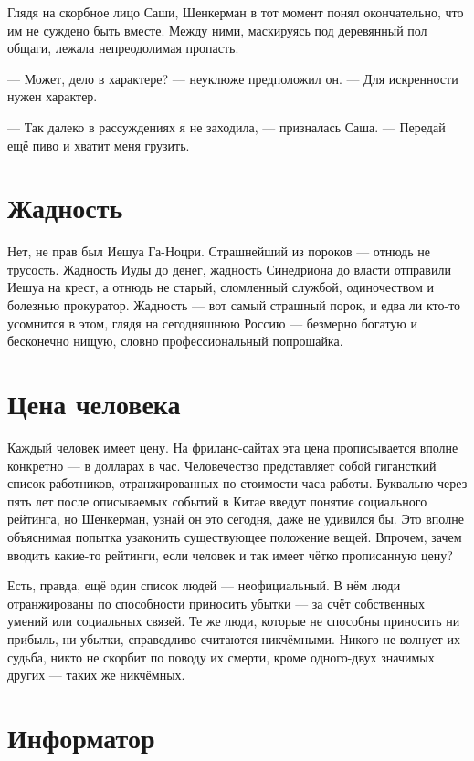 \documentclass[a4paper,10pt,fleqn]{book}\usepackage{polyglossia}\setdefaultlanguage{english}\setotherlanguage{russian}\defaultfontfeatures{Ligatures=TeX,Mapping=tex-text} \usepackage{xcolor}\definecolor{lightgray}{HTML}{bbbbbb}\color{lightgray}\newcommand{\ml}[3]{\textcolor{black}{#3}}
\begin{document}
Глядя на скорбное лицо Саши, Шенкерман в тот момент понял окончательно, что им не суждено быть вместе.
Между ними, маскируясь под деревянный пол общаги, лежала непреодолимая пропасть.

--- Может, дело в характере? --- неуклюже предположил он.
--- Для искренности нужен характер.

--- Так далеко в рассуждениях я не заходила, --- призналась Саша.
--- Передай ещё пиво и хватит меня грузить.

\section{Жадность}

Нет, не прав был Иешуа Га-Ноцри.
Страшнейший из пороков --- отнюдь не трусость.
Жадность Иуды до денег, жадность Синедриона до власти отправили Иешуа на крест, а отнюдь не старый, сломленный службой, одиночеством и болезнью прокуратор.
Жадность --- вот самый страшный порок, и едва ли кто-то усомнится в этом, глядя на сегодняшнюю Россию --- безмерно богатую и бесконечно нищую, словно профессиональный попрошайка.

\section{Цена человека}

Каждый человек имеет цену.
На фриланс-сайтах эта цена прописывается вполне конкретно --- в долларах в час.
Человечество представляет собой гигансткий список работников, отранжированных по стоимости часа работы.
Буквально через пять лет после описываемых событий в Китае введут понятие социального рейтинга, но Шенкерман, узнай он это сегодня, даже не удивился бы.
Это вполне объяснимая попытка узаконить существующее положение вещей.
Впрочем, зачем вводить какие-то рейтинги, если человек и так имеет чётко прописанную цену?

Есть, правда, ещё один список людей --- неофициальный.
В нём люди отранжированы по способности приносить убытки --- за счёт собственных умений или социальных связей.
Те же люди, которые не способны приносить ни прибыль, ни убытки, справедливо считаются никчёмными.
Никого не волнует их судьба, никто не скорбит по поводу их смерти, кроме одного-двух значимых других --- таких же никчёмных.

\section{Информатор}
\end{document}

